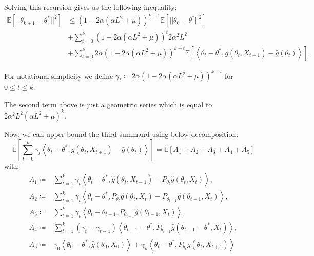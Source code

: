 \documentclass[a4paper]{article}
\begin{document}
Solving this recursion gives us the following inequality:
\begin{equation}
	\begin{split}
		\mathbb{E}\left[||\theta_{k + 1} - \theta^{*}||^{2}\right] & \le \left(1 - 2\alpha\left(\alpha L^{2} + \mu\right)\right)^{k + 1}\mathbb{E}\left[||\theta_{0} - \theta^{*}||^{2}\right] \\
		& + \sum_{t = 0}^{k}\left(1 - 2\alpha\left(\alpha L^{2} + \mu\right)\right)^{t}2\alpha^{2}L^{2} \\
		& + \sum_{t = 0}^{k}2\alpha\left(1 - 2\alpha\left(\alpha L^{2} + \mu\right)\right)^{k - t}\mathbb{E}\left[\left\langle \theta_{t} - \theta^{*}, g\left(\theta_{t}, X_{t + 1}\right) - \bar{g}\left(\theta_{t}\right) \right\rangle\right].
	\end{split}
\end{equation}

For notational simplicity we define $\gamma_{t} \coloneq 2\alpha\left(1 - 2\alpha\left(\alpha L^{2} + \mu\right)\right)^{k - t}$ for $0 \le t \le k$.

The second term above is just a geometric series which is equal to $2\alpha^{2}L^{2}\left(\alpha L^{2} + \mu\right)^{k}$.

Now, we can upper bound the third summand using below decomposition:
\begin{equation}
	\mathbb{E}\left[ \sum_{t = 0}^{k} \gamma_{t}\left\langle \theta_{t} - \theta^{*}, g(\theta_{t}, X_{t + 1}) - \bar{g}(\theta_{t}) \right\rangle \right] = \mathbb{E}\left[ A_{1} + A_{2} + A_{3} + A_{4} + A_{5}\right]
\end{equation}
with
\begin{equation*}
	\begin{split}
		A_{1} \coloneq & \sum_{t = 1}^{k}\gamma_{t}\left\langle \theta_{t} - \theta^{*}, \hat{g}\left(\theta_{t}, X_{t + 1}\right) - P_{\theta_{t}}\hat{g}\left(\theta_{t}, X_{t}\right) \right\rangle,\\
		A_{2} \coloneq & \sum_{t = 1}^{k}\gamma_{t}\left\langle \theta_{t} - \theta^{*}, P_{\theta_{t}}\hat{g}\left(\theta_{t}, X_{t}\right) - P_{\theta_{t - 1}}\hat{g}\left( \theta_{t - 1}, X_{t} \right) \right\rangle,\\
		A_{3} \coloneq & \sum_{t = 1}^{k}\gamma_{t}\left\langle \theta_{t} - \theta_{t - 1}, P_{\theta_{t - 1}}\hat{g}\left( \theta_{t - 1}, X_{t}\right) \right\rangle,\\
		A_{4} \coloneq & \sum_{t = 1}^{k}\left(\gamma_{t} - \gamma_{t - 1}\right)\left\langle \theta_{t - 1} - \theta^{*}, P_{\theta_{t - 1}}\hat{g}\left( \theta_{t - 1} - \theta^{*}, X_{t}\right) \right\rangle,\\
		A_{5} \coloneq & \gamma_{0}\left\langle \theta_{0} - \theta^{*}, \hat{g}\left(\theta_{0}, X_{0}\right) \right\rangle + \gamma_{k}\left\langle \theta_{t} - \theta^{*}, P_{\theta_{t}}\hat{g}\left(\theta_{t}, X_{t + 1}\right)\right\rangle
	\end{split}
\end{equation*}
\end{document}
